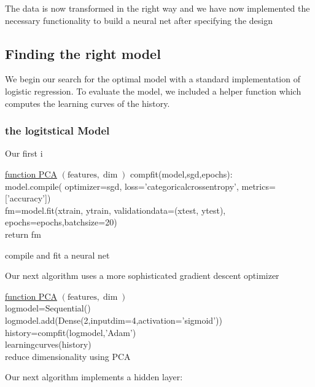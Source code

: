 \documentclass[14pt]{article}
\theoremstyle{plain}
\theoremstyle{definition}
\newcommand{\un}{\textunderscore}
\begin{document}
The data is now transformed in the right way and we have now implemented the necessary functionality to build a neural net after specifying the design

\subsection{Finding the right model}
We begin our search for the optimal model with a standard implementation of logistic regression. To evaluate the model, we included a helper function which computes the learning curves of the history.
\subsubsection{the logitstical Model}
Our first i
\begin{algorithm}


    \underline{function PCA} $(\textrm{features}, \dim)$\;
comp\un fit(model,sgd,epochs):\\
model.compile( optimizer=sgd, loss='categorical\un crossentropy', metrics=['accuracy'])\\
fm=model.fit(x\un train, y\un train, validation\un data=(x\un test, y\un test), epochs=epochs,batch\un size=20)\\
return fm
   \caption{compile and fit a neural net }
\end{algorithm}

Our next algorithm uses a more sophisticated gradient descent optimizer

\begin{algorithm}
	\underline{function PCA} $(\textrm{features}, \dim)$\\
	log\un model=Sequential()\\
	log\un model.add(Dense(2,input\un dim=4,activation='sigmoid'))\\
	history=comp\un fit(log\un model,'Adam')\\
	learning\un curves(history)\\
   \caption{reduce dimensionality using PCA }
\end{algorithm}  

Our next algorithm implements a hidden layer:
\end{document}
